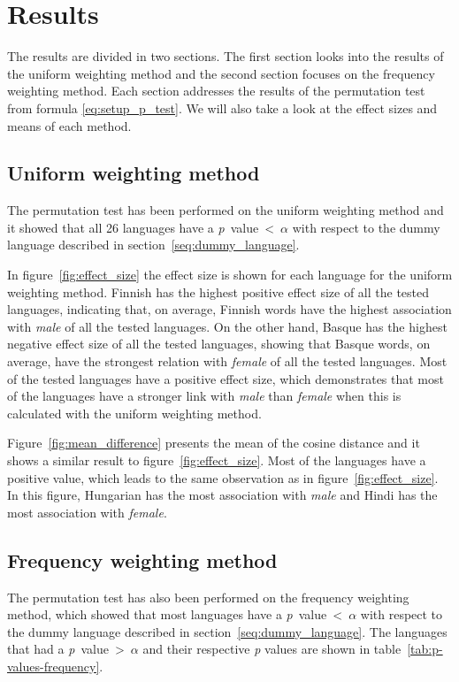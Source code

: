 \section{Results} \label{ch:results}
The results are divided in two sections. The first section looks into
the results of the uniform weighting method and the second section focuses on 
the frequency weighting method. Each section addresses the results of the
permutation test from formula \eqref{eq:setup_p_test}. We will also take a look
at the effect sizes and means of each method.

\subsection{Uniform weighting method}
The permutation test has been performed on the uniform weighting method and it showed that
all 26 languages have a \mbox{\emph{p} value < $\alpha$} with respect to
the dummy language described in section~\ref{seq:dummy_language}. 

In figure~\ref{fig:effect_size} the effect size is shown for each language for the
uniform weighting method.
Finnish has the highest positive effect size of all the tested languages, indicating that,
on average,
Finnish words have the highest association with \emph{male} of all the tested languages.
On the other hand, Basque has the highest negative effect size of all the tested languages,
showing that Basque words, on average, have the strongest relation with \emph{female} of
all the tested languages.
Most of the tested languages have a positive effect size, which demonstrates that most of
the languages have a stronger link with \emph{male} than \emph{female} when this
is calculated with the uniform weighting method.

Figure~\ref{fig:mean_difference} presents the mean of the cosine distance and it
shows a similar result to figure~\ref{fig:effect_size}. Most of the languages
have a positive value, which leads to the same observation as in
figure~\ref{fig:effect_size}. In this figure, Hungarian has the most 
association with \emph{male} and Hindi has the most association with \emph{female}.

\subsection{Frequency weighting method}
The permutation test has also been performed on the frequency weighting method,
which showed that most languages have a \mbox{\emph{p} value < $\alpha$} with respect to
the dummy language described in section~\ref{seq:dummy_language}. The languages
that had a \mbox{\emph{p} value > $\alpha$} and their respective \emph{p} values
are shown in table~\ref{tab:p-values-frequency}.

